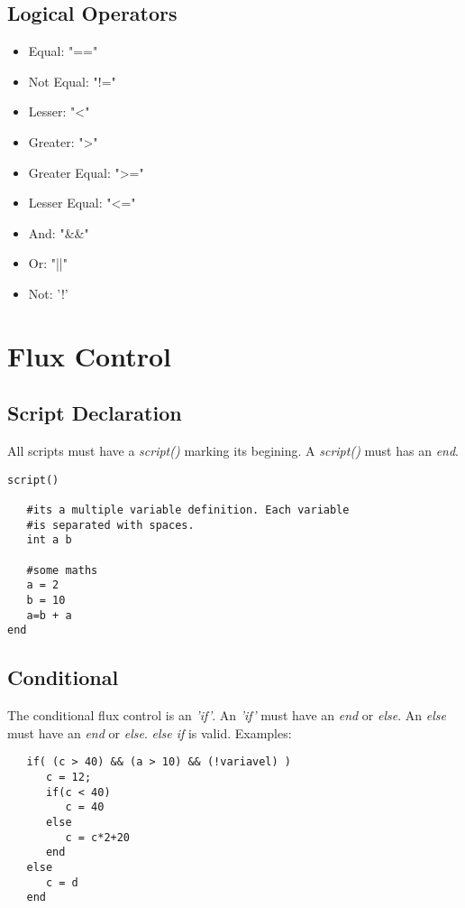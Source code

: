 \documentclass[ letterpaper,12pt]{article}
\begin{document}
\subsection{Logical Operators}

\begin{itemize}
\item{Equal: "=="}
\item{Not Equal: "!="}
\item{Lesser: "<"}
\item{Greater: ">"}
\item{Greater Equal: ">="}
\item{Lesser Equal: "<="}
\item{And: "\&\&"}
\item{Or: "||"}
\item{Not: '!'}
\end{itemize}

\section{Flux Control}

\subsection{Script Declaration}

All scripts must have a {\it script()} marking its begining. A {\it script()}
must has an {\it end}.

\begin{verbatim}
script()

   #its a multiple variable definition. Each variable
   #is separated with spaces.
   int a b

   #some maths
   a = 2
   b = 10
   a=b + a
end
\end{verbatim}

\subsection{Conditional}

The conditional flux control is an {\it 'if'}. An {\it 'if'} must have an {\it
end} or {\it else}. An {\it else} must have an {\it end} or {\it else}. {\it
else if} is valid. Examples:

\begin{verbatim}
   if( (c > 40) && (a > 10) && (!variavel) )
      c = 12;
      if(c < 40)
         c = 40
      else
         c = c*2+20
      end
   else
      c = d
   end
\end{verbatim}
\end{document}

